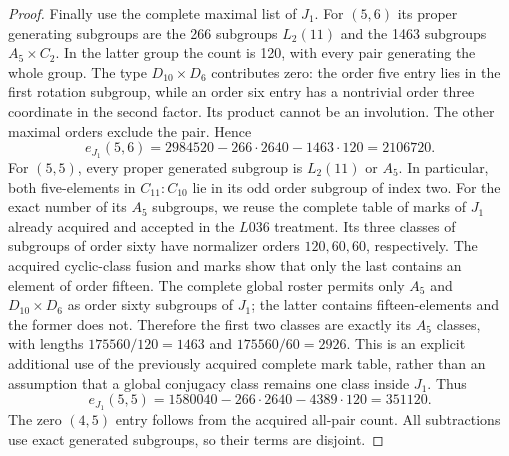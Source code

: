 \documentclass[11pt,a4paper]{article}
\begin{document}
\begin{proof}
Finally use the complete maximal list of $J_1$. For $(5,6)$ its
proper generating subgroups are the 266 subgroups $L_2(11)$ and
the 1463 subgroups $A_5\times C_2$. In the latter group the count
is 120, with every pair generating the whole group. The type
$D_{10}\times D_6$ contributes zero: the order five entry lies in
the first rotation subgroup, while an order six entry has a
nontrivial order three coordinate in the second factor. Its
product cannot be an involution. The other maximal orders exclude
the pair. Hence
\[
 e_{J_1}(5,6)=2984520-266\cdot2640-1463\cdot120=2106720.
\]
For $(5,5)$, every proper generated subgroup is $L_2(11)$ or $A_5$.
In particular, both five-elements in $C_{11}:C_{10}$ lie in its
odd order subgroup of index two. For the exact number of its $A_5$ subgroups, we reuse the complete
table of marks of $J_1$ already acquired and accepted in the
$L036$ treatment. Its three classes of subgroups of order sixty
have normalizer orders $120,60,60$, respectively. The acquired
cyclic-class fusion and marks show that only the last contains
an element of order fifteen. The complete global roster permits
only $A_5$ and $D_{10}\times D_6$ as order sixty subgroups of
$J_1$; the latter contains fifteen-elements and the former does
not. Therefore the first two classes are exactly its $A_5$
classes, with lengths $175560/120=1463$ and $175560/60=2926$.
This is an explicit additional use of the previously acquired
complete mark table, rather than an assumption that a global
conjugacy class remains one class inside $J_1$. Thus
\[
 e_{J_1}(5,5)=1580040-266\cdot2640-4389\cdot120=351120.
\]
The zero $(4,5)$ entry follows from the acquired all-pair count.
All subtractions use exact generated subgroups, so their terms
are disjoint.
\end{proof}
\end{document}
